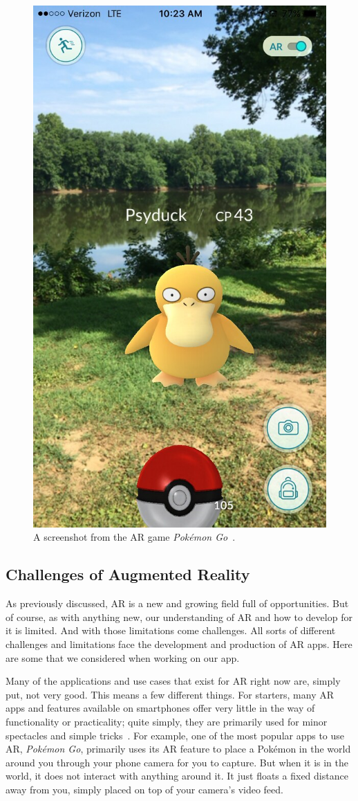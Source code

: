 \documentclass[a4paper, 10pt, american, titlepage]{article}
\begin{document}
\begin{figure}[h]
	\centering
	\includegraphics[width=.5\textwidth]{pokemon-go.jpg}
	\caption[A screenshot from the AR game \textit{Pokémon Go}]{A screenshot
		from the AR game \textit{Pokémon Go}~\autocite{vastateparks2016}.}
	\label{fig:pokemonGo}
\end{figure}

\subsection{Challenges of Augmented Reality}
\label{sec:challengesOfAugmentedReality}

As previously discussed, AR is a new and growing field full of opportunities.
But of course, as with anything new, our understanding of AR and how to develop
for it is limited.  And with those limitations come challenges. All sorts of
different challenges and limitations face the development and production of AR
apps. Here are some that we considered when working on our app.

Many of the applications and use cases that exist for AR right now are, simply
put, not very good. This means a few different things. For starters, many AR
apps and features available on smartphones offer very little in the way of
functionality or practicality; quite simply, they are primarily used for minor
spectacles and simple tricks~\autocite{theappsolutions2018}. For example, one of
the most popular apps to use AR, \textit{Pokémon Go}, primarily uses its AR
feature to place a Pokémon in the world around you through your phone camera for
you to capture. But when it is in the world, it does not interact with anything
around it. It just floats a fixed distance away from you, simply placed on top
of your camera's video feed.
\end{document}

